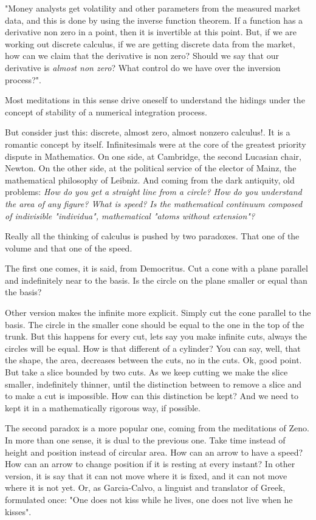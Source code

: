 \documentclass[a4paper,10pt]{article}
\begin{document}
"Money analysts get volatility and other parameters from the measured
market data, and this is done by using the inverse function theorem.
If a function has a derivative non zero in a point, then it is
invertible at this point. But, if we are working out discrete
calculus, if we are getting discrete data from the market, how
can we claim that the derivative is non zero? Should we say that
our derivative is {\it almost non zero}? What control do we have over
the inversion process?". 

Most meditations in this sense drive oneself to understand the hidings under
the concept of stability of a numerical integration process. 

But consider just this: discrete, almost zero, almost nonzero calculus!.
 It is a romantic concept by
itself. Infinitesimals were at the core of the greatest priority dispute
in Mathematics. On one side, at Cambridge, the second Lucasian chair,
Newton. On the other side, at the political service of the elector of
Mainz, the mathematical philosophy of Leibniz. And coming from 
the dark antiquity, old problems: {\it How do you get a straight line from
a circle?  How do you understand the area of any figure? What
is speed? Is the mathematical continuum composed of indivisible
"individua", mathematical "atoms without extension"?} 

Really all the thinking of calculus is pushed by two paradoxes. That one
of the volume and that one of the speed. 

The first one comes, it is said, from Democritus. Cut a cone with a plane
parallel and indefinitely  near to the basis. Is the circle on the plane
smaller or equal than the basis? 

Other version makes the infinite more explicit. Simply cut the cone parallel
to the basis. The circle in the smaller cone should be equal to the one
in the top of the trunk. But this happens for every cut, lets say you make
infinite cuts, always the circles will be equal. How is that different of
a cylinder? You can say, well, that the shape, the area, decreases between the
cuts, no in the cuts. Ok, good point. But take a slice bounded by two
cuts. As we keep cutting we make the slice smaller, indefinitely thinner,
until the distinction between to remove a slice and to make a cut is  
impossible. How can this distinction be kept? And we need to kept it in
a mathematically rigorous way, if possible.

The second paradox is a more popular one, coming from
the meditations of Zeno. In more than one sense, it is dual to the
previous one. Take time instead of height and position instead of circular
area. How can an arrow to have a speed? How can an arrow to change position
if it is resting at  every instant? In other version, it is say that it
can not move where it is fixed, and it can not move where it is not yet. Or,
as Garcia-Calvo, a linguist and translator of Greek, formulated once: 
"One does not kiss while he lives, one does not live when
he kisses".
\end{document}
